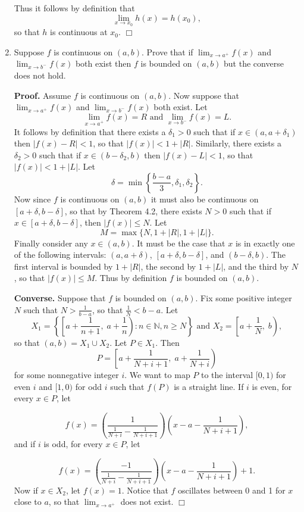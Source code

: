 \documentclass[9pt]{article}
\newcommand{\qed}{\hfill \ensuremath{\Box}}
\newcommand{\N}{\mathbb{N}}
\newcommand{\D}{\displaystyle}
\begin{document}
\begin{enumerate}
      Thus it follows by definition that
      $$\lim_{x\rightarrow x_0}h(x) = h(x_0),$$
      so that $h$ is continuous at $x_0$. \qed
   \item Suppose $f$ is continuous on $(a, b)$. Prove that if
         $\lim_{x\rightarrow a^+} f(x)$ and $\lim_{x\rightarrow b^-} f(x)$ both
         exist then $f$ is bounded on $(a, b)$ but the converse does not hold.
         
      \textbf{Proof.} Assume $f$ is continuous on $(a, b)$. Now suppose that
      $\lim_{x\rightarrow a^+} f(x)$ and $\lim_{x\rightarrow b^-} f(x)$ both
      exist. Let
      $$\lim_{x\rightarrow a^+} f(x) = R \text{ and }
        \lim_{x\rightarrow b^-} f(x) = L.$$
      It follows by definition that there exists a $\delta_1 > 0$ such that if
      $x \in (a, a + \delta_1)$ then $|f(x) - R| < 1$, so that
      $|f(x)| < 1 + |R|$. Similarly, there exists a $\delta_2 > 0$ such that if
      $x \in (b - \delta_2, b)$ then $|f(x) - L| < 1$, so that
      $|f(x)| < 1 + |L|$. Let
      $$\delta = \min\left\{\frac{b - a}{3},\delta_1, \delta_2\right\}.$$
      Now since $f$ is continuous on $(a, b)$ it must also be continuous on
      $[a + \delta, b - \delta]$, so that by Theorem 4.2, there exists $N > 0$
      such that if $x \in [a + \delta, b - \delta]$, then $|f(x)| \le N$. Let
      $$M = \max\{N, 1 + |R|, 1 + |L|\}.$$
      Finally consider any $x \in (a, b)$. It must be the case that $x$ is in
      exactly one of the following intervals: $(a, a + \delta)$,
      $[a + \delta, b - \delta]$, and $(b - \delta, b)$. The first interval is
      bounded by $1 + |R|$, the second by $1 + |L|$, and the third by $N$, so
      that $|f(x)| \le M$. Thus by definition $f$ is bounded on $(a, b)$.
      
      \textbf{Converse.} Suppose that $f$ is bounded on $(a, b)$. Fix some
      positive integer $N$ such that $\D N > \frac{1}{b - a}$, so that
      $\D\frac{1}{N} < b - a$. Let
      $$X_1 = \left\{\left[a + \frac{1}{n+1},\; a + \frac{1}{n}\right) :
      n \in \N, n \ge N \right\} \text{ and } X_2 = \left[a + \frac{1}{N}, \;b\right),$$
      so that $(a, b) = X_1 \cup X_2$. Let $P \in X_1$. Then 
      $$P = \left[a + \frac{1}{N + i + 1},\; a + \frac{1}{N + i}\right)$$
      for some nonnegative integer $i$. We want to map $P$ to the interval
      $[0, 1)$ for even $i$ and $[1, 0)$ for odd $i$ such that $f(P)$ is a
      straight line. If $i$ is even, for every $x \in P$, let
      
      $$f(x) = \left(\frac{1}{\D\frac{1}{N+i} - \frac{1}{N+i+1}}\right)
               \left(x - a - \frac{1}{N+i+1}\right),$$
      and if $i$ is odd, for every $x \in P$, let
      
      $$f(x) = \left(\frac{-1}{\D\frac{1}{N+i} - \frac{1}{N+i+1}}\right)
               \left(x - a - \frac{1}{N+i+1}\right) + 1.$$
      Now if $x \in X_2$, let $f(x) = 1$. Notice that $f$ oscillates between 0
      and 1 for $x$ close to $a$, so that $\lim_{x\rightarrow a^+}$ does not
      exist. \qed
      
      
\end{enumerate}
\end{document}

